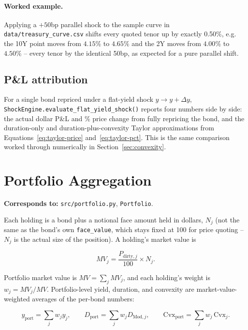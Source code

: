 \documentclass[11pt]{article}
\begin{document}
\paragraph{Worked example.} Applying a $+50$bp parallel shock to the sample curve in
\texttt{data/treasury\_curve.csv} shifts every quoted tenor up by exactly 0.50\%, e.g. the 10Y
point moves from $4.15\%$ to $4.65\%$ and the 2Y moves from $4.00\%$ to $4.50\%$ -- every tenor
by the identical 50bp, as expected for a pure parallel shift.

\subsection{P\&L attribution}

For a single bond repriced under a flat-yield shock $y \to y + \Delta y$,
\texttt{ShockEngine.evaluate\_flat\_yield\_shock()} reports four numbers side by side: the
actual dollar P\&L and \% price change from fully repricing the bond, and the duration-only
and duration-plus-convexity Taylor approximations from Equations~\ref{eq:taylor-price}
and~\ref{eq:taylor-pct}. This is the same comparison worked through numerically in
Section~\ref{sec:convexity}.

\section{Portfolio Aggregation}
\label{sec:portfolio}

\textbf{Corresponds to:} \texttt{src/portfolio.py}, \texttt{Portfolio}.

Each holding is a bond plus a notional face amount held in dollars, $N_j$ (not the same as the
bond's own \texttt{face\_value}, which stays fixed at 100 for price quoting -- $N_j$ is the
actual size of the position). A holding's market value is

\begin{equation}
  MV_j = \frac{P_{\text{dirty},j}}{100} \times N_j.
  \label{eq:holding-mv}
\end{equation}

Portfolio market value is $MV = \sum_j MV_j$, and each holding's weight is $w_j = MV_j / MV$.
Portfolio-level yield, duration, and convexity are market-value-weighted averages of the
per-bond numbers:

\begin{equation}
  y_{\text{port}} = \sum_j w_j y_j, \qquad
  D_{\text{port}} = \sum_j w_j D_{\text{Mod},j}, \qquad
  \text{Cvx}_{\text{port}} = \sum_j w_j\,\text{Cvx}_j.
  \label{eq:portfolio-weighted}
\end{equation}
\end{document}
